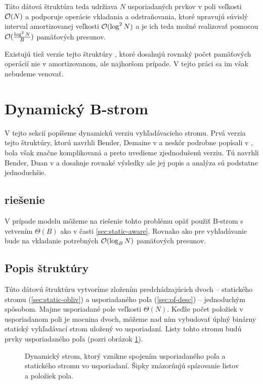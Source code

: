Táto dátová štruktúra teda udržiava $N$ usporiadaných prvkov v poli veľkosti $\mathcal{O}(N)$ a podporuje operácie vkladania a odstraňovania, ktoré upravujú súvislý interval amortizovanej veľkosti $\mathcal{O}(\log^2{N})$ a je ich teda možné realizovať pomocou $\mathcal{O}(\frac{\log^2{N}}{B})$ pamäťových presunov.

Existujú tiež verzie tejto štruktúry \citep{bender2002ofworstcase}, ktoré dosahujú rovnaký počet pamäťových operácií nie v amortizovanom, ale najhoršom prípade. V tejto práci sa im však nebudeme venovať.

\section{Dynamický B-strom} \label{sec:dynamic-obliv}
V tejto sekcií popíšeme dynamickú verziu \obliv vyhľadávacieho stromu. Prvá verzia tejto štruktúry, ktorú navrhli Bender, Demaine \etal v \citep{btreeshort} a neskôr podrobne popísali v \citep{btreefull}, bola však značne komplikovaná a preto uvedieme zjednodušenú verziu. Tú navrhli Bender, Duan \etal v \citep{bender2002} a dosahuje rovnaké výsledky ale jej popis a analýza sú podstatne jednoduchšie.

\subsection{\Aware riešenie}
V prípade \aware modelu môžeme na riešenie tohto problému opäť použiť B-strom s vetvením $\Theta(B)$ ako v časti \ref{sec:static-aware}. Rovnako ako pre vyhľadávanie bude na vkladanie potrebných $\mathcal{O}(\log_B{N})$ pamäťových presunov.

\subsection{Popis \obliv štruktúry}
Túto dátovú štruktúru vytvoríme zložením predchádzajúcich dvoch -- statického stromu (\ref{sec:static-obliv}) a usporiadaného poľa (\ref{sec:of-desc}) -- jednoduchým spôsobom. Majme usporiadané pole veľkosti $\Theta(N)$. Keďže počet položiek v usporiadanom poli je mocnina dvoch, môžeme nad ním vybudovať úplný binárny statický vyhľadávací strom uložený vo  usporiadaní. Listy tohto stromu budú prvky usporiadaného poľa (pozri obrázok \ref{fig:cobtree_overview}).

\begin{figure}
    \centering
    \resizebox{\textwidth}{!}{
        
    }
    \caption[Dynamický strom]{Dynamický strom, ktorý vznikne spojením usporiadaného poľa a statického stromu vo  usporiadaní. Šipky znázorňujú spárovanie listov a položiek pola.}
    \label{fig:cobtree_overview}
\end{figure}

